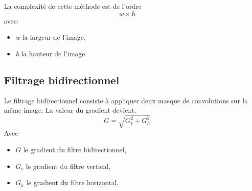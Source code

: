 \documentclass[11pt]{article}
\begin{document}
	La complexité de cette méthode est de l’ordre \[w \times h\] avec:
	\begin{itemize}
		\item \textit{w} la largeur de l’image,
		\item \textit{h} la hauteur de l’image. 
	\end{itemize}


	\subsection{Filtrage bidirectionnel}

	Le filtrage bidirectionnel consiste à appliquer deux masque de convolutions sur la même image.
	La valeur du gradient devient: 
	\[G = \sqrt{G_{v}^2 + G_{h}^2}\]
	Avec 
	\begin{itemize}
		\item $G$ le gradient du filtre bidirectionnel,
		\item $G_{v}$ le gradient du filtre vertical,
		\item $G_{h}$ le gradient du filtre horizontal.
	\end{itemize}
            
\end{document}
